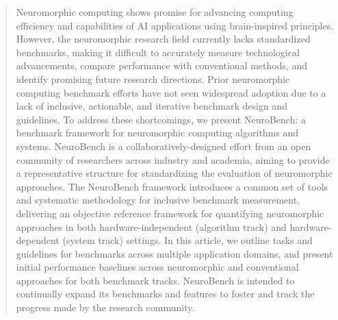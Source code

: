 
\begin{abstract}
Neuromorphic computing shows promise for advancing computing efficiency and capabilities of AI applications using brain-inspired principles. However, the neuromorphic research field currently lacks standardized benchmarks, making it difficult to accurately measure technological advancements, compare performance with conventional methods, and identify promising future research directions. Prior neuromorphic computing benchmark efforts have not seen widespread adoption due to a lack of inclusive, actionable, and iterative benchmark design and guidelines. To address these shortcomings, we present NeuroBench: a benchmark framework for neuromorphic computing algorithms and systems. NeuroBench is a collaboratively-designed effort from an open community of researchers across industry and academia, aiming to provide a representative structure for standardizing the evaluation of neuromorphic approaches. The NeuroBench framework introduces a common set of tools and systematic methodology for inclusive benchmark measurement, delivering an objective reference framework for quantifying neuromorphic approaches in both hardware-independent (algorithm track) and hardware-dependent (system track) settings. In this article, we outline tasks and guidelines for benchmarks across multiple application domains, and present initial performance baselines across neuromorphic and conventional approaches for both benchmark tracks.
NeuroBench is intended to continually expand its benchmarks and features to foster and track the progress made by the research community.



\end{abstract}
